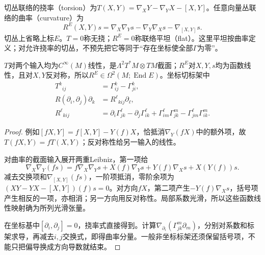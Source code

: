 \begin{definition}[挠率与曲率]\label{def:torsion-curvature}
切丛联络的挠率（torsion）为$T(X,Y)=\nabla_XY-\nabla_YX-[X,Y]$。任意向量丛联络的曲率（curvature）为
\[
 R^E(X,Y)s=\nabla_X\nabla_Ys-\nabla_Y\nabla_Xs-\nabla_{[X,Y]}s.
\]
切丛上省略上标$E$。$T=0$称无挠；$R^E=0$称联络平坦（flat）。这里平坦按曲率定义；对允许挠率的切丛，不预先把它等同于“存在坐标使全部$\Gamma$为零”。
\end{definition}

\begin{proposition}[张量性与分量]\label{prop:curvature-tensor}
$T$对两个输入均为$C^\infty(M)$线性，是$\Lambda^2T^*M\otimes TM$截面；$R^E$对$X,Y,s$均为函数线性，且对$X,Y$反对称，所以$R^E\in\Omega^2(M;\operatorname{End}E)$。坐标切标架中
\begin{align*}
 T^k{}_{ij}&=\Gamma^k_{ij}-\Gamma^k_{ji},\\
 R(\partial_i,\partial_j)\partial_k&=R^\ell{}_{kij}\partial_\ell,\\
 R^\ell{}_{kij}&=\partial_i\Gamma^\ell_{jk}-\partial_j\Gamma^\ell_{ik}
 +\Gamma^\ell_{im}\Gamma^m_{jk}-\Gamma^\ell_{jm}\Gamma^m_{ik}.
\end{align*}
\end{proposition}
\begin{proof}
例如$[fX,Y]=f[X,Y]-Y(f)X$，恰抵消$\nabla_Y(fX)$中的额外项，故$T(fX,Y)=fT(X,Y)$；反对称性给另一输入的线性。

对曲率的截面输入展开两重Leibniz，第一项给
\[
 \nabla_X\nabla_Y(fs)=f\nabla_X\nabla_Ys+X(f)\nabla_Ys
 +Y(f)\nabla_Xs+X(Y(f))s.
\]
减去交换项和$\nabla_{[X,Y]}(fs)$，一阶项抵消，零阶余项为$(XY-YX-[X,Y])(f)s=0$。对方向$fX$，第二项产生$-Y(f)\nabla_Xs$，括号项产生相反的一项，亦相消；另一方向用反对称性。局部系数光滑，所以这些函数线性映射确为所列光滑张量。

在坐标基中$[\partial_i,\partial_j]=0$，挠率式直接得到。计算$\nabla_{\partial_i}(\Gamma^m_{jk}\partial_m)$，分别对系数和标架求导，再减去$i,j$交换式，即得曲率分量。一般非坐标标架还须保留括号项，不能只把偏导换成方向导数就结束。
\end{proof}

